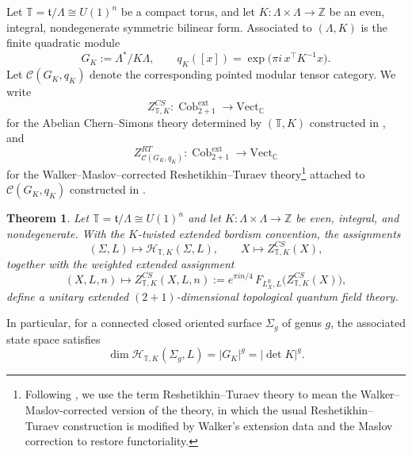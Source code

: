 \documentclass[12pt]{amsart}
\numberwithin{equation}{section}
\newtheorem{theorem}{Theorem}[section]
\DeclareMathOperator{\Cob}{Cob}
\begin{document}
Let $\mathbb T=\mathfrak t/\Lambda \cong U(1)^n$ be a compact torus, and let $K:\Lambda\times\Lambda \to \mathbb Z$ be an even, integral, nondegenerate symmetric bilinear form. Associated to
$(\Lambda,K)$ is the finite quadratic module
\[
G_K:=\Lambda^{*}/K\Lambda,
\qquad
q_K([x])=\exp\!\bigl(\pi i\, x^{\top}K^{-1}x\bigr).
\]
Let $\mathcal C(G_K,q_K)$ denote the corresponding pointed modular tensor
category. We write
\[
Z^{CS}_{\mathbb T,K}:\Cob^{\mathrm{ext}}_{2+1}\longrightarrow \mathrm{Vect}_{\mathbb C}
\]
for the Abelian Chern--Simons theory determined by $(\mathbb T,K)$ constructed in \cite{Galviz2}, and
\[
Z^{RT}_{\mathcal C(G_K,q_K)}:\Cob^{\mathrm{ext}}_{2+1}\longrightarrow \mathrm{Vect}_{\mathbb C}
\]
for the Walker--Maslov--corrected Reshetikhin--Turaev theory\footnote{Following \cite{Galviz2}, we use the term Reshetikhin--Turaev theory to mean the Walker--Maslov-corrected version of the theory, in which the usual Reshetikhin--Turaev construction is modified by Walker’s extension data and the Maslov correction to restore functoriality.} attached to
$\mathcal C(G_K,q_K)$ constructed in \cite{Galviz3}.

\begin{theorem}{\cite[Theorem 4.8]{Galviz2}}
Let $\mathbb T=\mathfrak t/\Lambda\cong U(1)^n$ and let
$K:\Lambda\times\Lambda\to\mathbb Z$ be even, integral, and nondegenerate.
With the $K$-twisted extended bordism convention, the assignments
\[
(\Sigma,L)\longmapsto \mathcal H_{\mathbb T,K}(\Sigma,L),
\qquad
X\longmapsto Z^{CS}_{\mathbb T,K}(X),
\]
together with the weighted extended assignment
\[
(X,L,n)\longmapsto Z^{CS}_{\mathbb T,K}(X,L,n)
:=
e^{\pi i n/4}\,
F_{L_X^{\mathbb R},L}\!\bigl(Z^{CS}_{\mathbb T,K}(X)\bigr),
\]
define a unitary extended $(2+1)$-dimensional topological quantum field theory.
\end{theorem}

In particular, for a connected closed oriented surface $\Sigma_g$ of genus $g$,
the associated state space satisfies
\[
\dim \mathcal H_{\mathbb T,K}(\Sigma_g,L)=|G_K|^g=|\det K|^g.
\]
\end{document}
